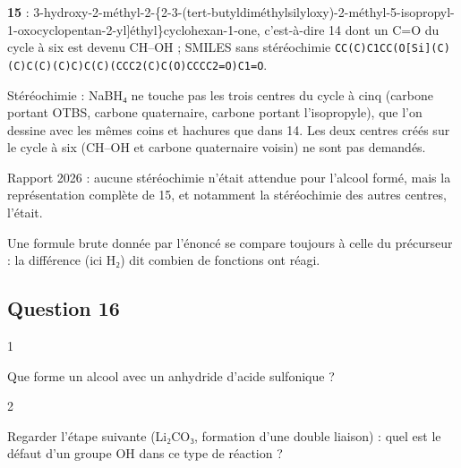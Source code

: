 \documentclass[11pt,a4paper]{article}
\begin{document}
\textbf{15} : 3-\allowbreak{}hydroxy-\allowbreak{}2-\allowbreak{}méthyl-\allowbreak{}2-\allowbreak{}\{2-\allowbreak{}{[}3-\allowbreak{}(tert-\allowbreak{}butyldiméthylsilyloxy)-\allowbreak{}2-\allowbreak{}méthyl-\allowbreak{}5-\allowbreak{}isopropyl-\allowbreak{}1-\allowbreak{}oxocyclopentan-\allowbreak{}2-\allowbreak{}yl{]}éthyl\}cyclohexan-\allowbreak{}1-\allowbreak{}one, c'est-à-dire 14 dont un C=O du cycle à six est devenu CH--OH ; SMILES sans stéréochimie \texttt{CC(\allowbreak{}C)\allowbreak{}C1CC(\allowbreak{}O{[}Si{]}\allowbreak{}(\allowbreak{}C)\allowbreak{}(\allowbreak{}C)\allowbreak{}C(\allowbreak{}C)\allowbreak{}(\allowbreak{}C)\allowbreak{}C)\allowbreak{}C(\allowbreak{}C)\allowbreak{}(\allowbreak{}CCC2(\allowbreak{}C)\allowbreak{}C(\allowbreak{}O)\allowbreak{}CCCC2=\allowbreak{}O)\allowbreak{}C1=\allowbreak{}O}.

Stéréochimie : NaBH₄ ne touche pas les trois centres du cycle à cinq (carbone portant OTBS, carbone quaternaire, carbone portant l'isopropyle), que l'on dessine avec les mêmes coins et hachures que dans 14. Les deux centres créés sur le cycle à six (CH--OH et carbone quaternaire voisin) ne sont pas demandés.

\begin{jury}

Rapport 2026 : aucune stéréochimie n'était attendue pour l'alcool formé, mais la représentation complète de 15, et notamment la stéréochimie des autres centres, l'était.

\end{jury}

\begin{methode}

Une formule brute donnée par l'énoncé se compare toujours à celle du précurseur : la différence (ici H₂) dit combien de fonctions ont réagi.

\end{methode}

\hypertarget{question-16}{%
\subsection{Question 16}\label{question-16}}

\begin{indication}{1}

Que forme un alcool avec un anhydride d'acide sulfonique ?

\end{indication}

\begin{indication}{2}

Regarder l'étape suivante (Li₂CO₃, formation d'une double liaison) : quel est le défaut d'un groupe OH dans ce type de réaction ?

\end{indication}
\end{document}
